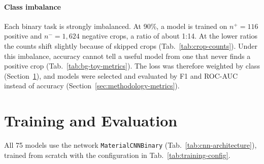 \paragraph{Class imbalance}
Each binary task is strongly imbalanced. At 90\%, a model is trained on $n^+ = 116$
positive and $n^- = 1{,}624$ negative crops, a ratio of about 1:14. At the lower
ratios the counts shift slightly because of skipped crops (Tab.~\ref{tab:crop-counts}).
Under this imbalance, accuracy cannot tell a useful model from one that never finds a
positive crop (Tab.~\ref{tab:bg-toy-metrics}). The loss was therefore weighted by class
(Section~\ref{sec:methodology-training}), and models
were selected and evaluated by F1 and ROC-AUC instead of accuracy (Section~\ref{sec:methodology-metrics}).

\section{Training and Evaluation}
\label{sec:methodology-training}

All 75 models use the network \texttt{MaterialCNNBinary}
(Tab.~\ref{tab:cnn-architecture}), trained from scratch with the configuration in
Tab.~\ref{tab:training-config}.

